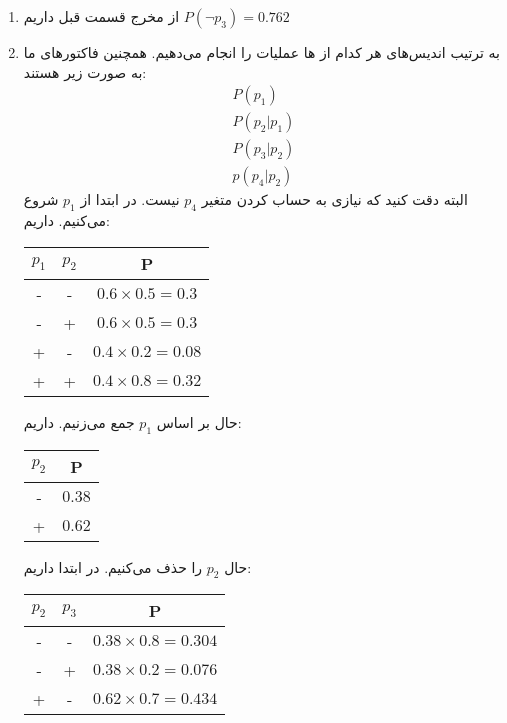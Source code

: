 \begin{enumerate}
    \item از مخرج قسمت قبل داریم $P(\neg p_3) = 0.762$
    \item به ترتیب اندیس‌های هر کدام از ها عملیات را انجام می‌دهیم.
    همچنین فاکتور‌های ما به صورت زیر هستند:
    \begin{gather*}
        P(p_1)\\
        P(p_2 | p_1)\\
        P(p_3 | p_2)\\
        p(p_4 | p_2)
    \end{gather*}
    البته دقت کنید که نیازی به حساب کردن متغیر
    $p_4$
    نیست. در ابتدا از
    $p_1$
    شروع می‌‌کنیم. داریم:
    \begin{latin}
    \centering
    \begin{tabular}{|c|c|c|}
        \hline
        $p_1$ & $p_2$ & P\\
        \hline
        - & - & $0.6 \times 0.5 = 0.3$\\
        \hline
        - & + & $0.6 \times 0.5 = 0.3$\\
        \hline
        + & - & $0.4 \times 0.2 = 0.08$\\
        \hline
        + & + & $0.4 \times 0.8 = 0.32$\\
        \hline
    \end{tabular}
    \end{latin}
    حال بر اساس
    $p_1$
    جمع می‌زنیم. داریم:
    \begin{latin}
        \centering
        \begin{tabular}{|c|c|}
            \hline
            $p_2$ & P\\
            \hline
            - & $0.38$\\
            \hline
            + & $0.62$\\
            \hline
        \end{tabular}
    \end{latin}
    حال
    $p_2$
    را حذف می‌کنیم.  در ابتدا داریم:
    \begin{latin}
        \centering
        \begin{tabular}{|c|c|c|}
            \hline
            $p_2$ & $p_3$ & P\\
            \hline
            - & - & $0.38 \times 0.8 = 0.304$\\
            \hline
            - & + & $0.38 \times 0.2 = 0.076$\\
            \hline
            + & - & $0.62 \times 0.7 = 0.434$\\

\end{tabular}
\end{latin}
\end{enumerate}
